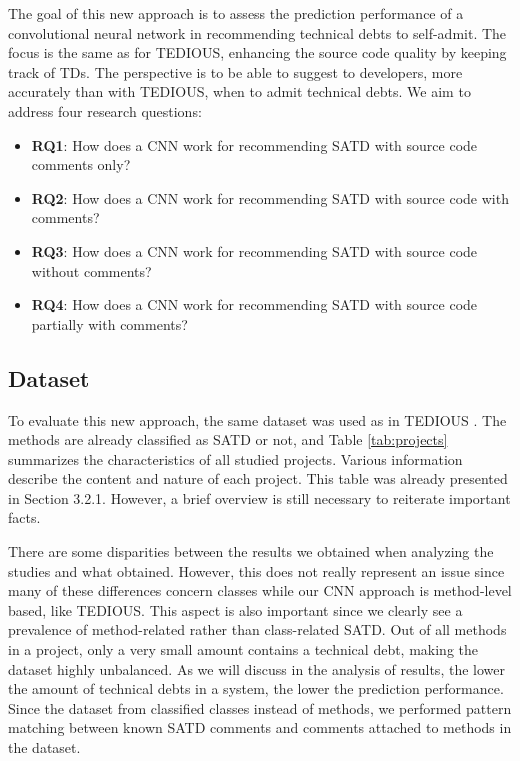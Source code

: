The goal of this new approach is to assess the prediction performance of a convolutional neural network in recommending technical debts to self-admit. The focus is the same as for TEDIOUS, enhancing the source code quality by keeping track of TDs. The perspective is to be able to suggest to developers, more accurately than with TEDIOUS, when to admit technical debts. We aim to address four research questions:

\begin{itemize}
	\item \textbf{RQ1}: How does a CNN work for recommending SATD with source code comments only?
	\item \textbf{RQ2}: How does a CNN work for recommending SATD with source code  with comments?
	\item \textbf{RQ3}: How does a CNN work for recommending SATD with source code without comments?
	\item \textbf{RQ4}: How does a CNN work for recommending SATD with source code partially with comments?
\end{itemize}

\subsection{Dataset}


To evaluate this new approach, the same dataset was used as in TEDIOUS \citep{maldonado17}. The methods are already classified as SATD or not, and Table \ref{tab:projects} summarizes the characteristics of all studied projects. Various information describe the content and nature of each project. This table was already presented in Section 3.2.1. However, a brief overview is still necessary to reiterate important facts. 

There are some disparities between the results we obtained when analyzing the studies and what \citet{maldonado17} obtained. However, this does not really represent an issue since many of these differences concern classes while our CNN approach is method-level based, like TEDIOUS. This aspect is also important since we clearly see a prevalence of method-related rather than class-related SATD. Out of all methods in a project, only a very small amount contains a technical debt, making the dataset highly unbalanced. As we will discuss in the analysis of results, the lower the amount of technical debts in a system, the lower the prediction performance. Since the dataset from \citet{maldonado17} classified classes instead of methods, we performed pattern matching between known SATD comments and comments attached to methods in the dataset.

